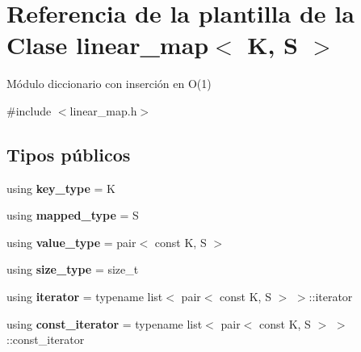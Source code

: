 \hypertarget{classlinear__map}{}\section{Referencia de la plantilla de la Clase linear\+\_\+map$<$ K, S $>$}
\label{classlinear__map}


Módulo diccionario con inserción en O(1)  




{\ttfamily \#include $<$linear\+\_\+map.\+h$>$}

\subsection*{Tipos públicos}
\begin{DoxyCompactItemize}
\item 
\mbox{\label{classlinear__map_a85577f6aa54870bf9b5d2f85f0749078}} 
using {\bfseries key\+\_\+type} = K
\item 
\mbox{\label{classlinear__map_aaed4a6810a4a46c0cede18821069cc65}} 
using {\bfseries mapped\+\_\+type} = S
\item 
\mbox{\label{classlinear__map_a8bf7640c132d7e6fa5c4e68e1623d27d}} 
using {\bfseries value\+\_\+type} = pair$<$ const K, S $>$
\item 
\mbox{\label{classlinear__map_a08095dfd88596e72f10d59a212b622f8}} 
using {\bfseries size\+\_\+type} = size\+\_\+t
\item 
\mbox{\label{classlinear__map_adbf8f5cd4879764446dab7673114b49b}} 
using {\bfseries iterator} = typename list$<$ pair$<$ const K, S $>$ $>$\+::iterator
\item 
\mbox{\label{classlinear__map_a5dc3aa756da9119bfb14aee312c46d2f}} 
using {\bfseries const\+\_\+iterator} = typename list$<$ pair$<$ const K, S $>$ $>$\+::const\+\_\+iterator
\end{DoxyCompactItemize}
